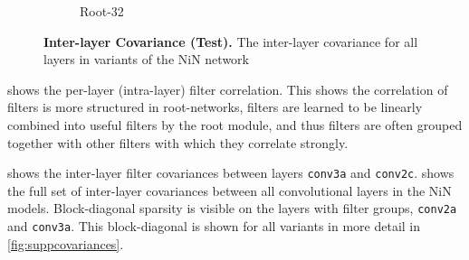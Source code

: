 \documentclass[thesis]{subfiles}
\begin{document}
{\begin{landscape}
\begin{figure}[p]
\begin{subfigure}[c]{0.75\paperheight}
					\hfill
					\hfill
					\hfill
					\caption{Root-32}
					\label{fig:covarroot32test}
				\end{subfigure}
				\caption[Inter-layer covariance all layers (test)]{\textbf{ Inter-layer Covariance (Test).} The inter-layer covariance for all layers in variants of the NiN network}
				\label{fig:suppcovariancestest}
			\end{figure}
		\end{landscape}
	}%
	 shows the per-layer (intra-layer) filter correlation. This shows the correlation of filters is more structured in root-networks, filters are learned to be linearly combined into useful filters by the root module, and thus filters are often grouped together with other filters with which they correlate strongly.
	
	 shows the inter-layer filter covariances between layers \texttt{conv3a} and \texttt{conv2c}.  shows the full set of inter-layer covariances between all convolutional layers in the NiN models. Block-diagonal sparsity is visible on the layers with filter groups, \texttt{conv2a} and \texttt{conv3a}. This block-diagonal is shown for all variants in more detail in \cref{fig:suppcovariances}.
	
\end{document}
